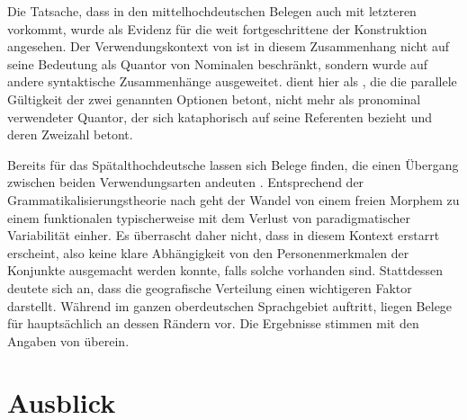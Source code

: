Die Tatsache, dass  in den
mittelhochdeutschen Belegen auch mit letzteren vorkommt,
wurde als Evidenz für die weit fortgeschrittene  der
Konstruktion angesehen. Der Verwendungskontext von
 ist in diesem Zusammenhang nicht auf seine Bedeutung als Quantor
von Nominalen beschränkt, sondern wurde auf andere syntaktische Zusammenhänge
ausgeweitet.  dient hier als , die die parallele
Gültigkeit der zwei genannten Optionen betont, nicht mehr als pronominal
verwendeter Quantor, der sich kataphorisch auf seine Referenten
bezieht und deren Zweizahl betont.

Bereits für das Spätalthochdeutsche lassen sich Belege
finden, die einen Übergang zwischen beiden Verwendungsarten
andeuten \autocite[vgl.\ die Beispiele in][627]{ksw2}. Entsprechend der
Grammatikalisierungstheorie nach
\citet[146--150]{lehmann2015} geht der Wandel von einem freien Morphem zu einem
funktionalen typischerweise mit dem Verlust von paradigmatischer
Variabilität einher. Es überrascht daher nicht, dass 
in diesem Kontext erstarrt erscheint, also keine klare Abhängigkeit von den
Personenmerkmalen der Konjunkte ausgemacht werden konnte,
falls solche vorhanden sind. Stattdessen deutete sich an, dass die geografische
Verteilung einen wichtigeren Faktor darstellt.
Während  im ganzen oberdeutschen Sprachgebiet
auftritt, liegen Belege für  hauptsächlich an dessen Rändern vor.
Die Ergebnisse stimmen mit den Angaben von \citet[627--628]{ksw2}
überein.



\section{Ausblick}

